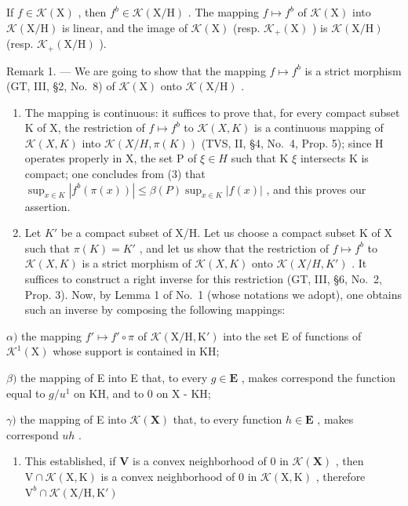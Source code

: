 If \(f \in \mathcal{K}(\mathrm{X})\) , then \(f^{b} \in \mathcal{K}(\mathrm{X / H})\) . The mapping \(f \mapsto f^{b}\) of \(\mathcal{K}(\mathrm{X})\) into \(\mathcal{K}(\mathrm{X / H})\) is linear, and the image of \(\mathcal{K}(\mathrm{X})\) (resp. \(\mathcal{K}_{+}(\mathrm{X})\) ) is \(\mathcal{K}(\mathrm{X / H})\) (resp. \(\mathcal{K}_{+}(\mathrm{X / H})\) ).

Remark 1. --- We are going to show that the mapping \(f \mapsto f^{b}\) is a strict morphism (GT, III, §2, No.~8) of \(\mathcal{K}(\mathrm{X})\) onto \(\mathcal{K}(\mathrm{X}/\mathrm{H})\) .

\begin{enumerate}
\def\labelenumi{\alph{enumi})}
\item
  The mapping is continuous: it suffices to prove that, for every compact subset K of X, the restriction of \(f \mapsto f^{b}\) to \(\mathcal{K}(X, K)\) is a continuous mapping of \(\mathcal{K}(X, K)\) into \(\mathcal{K}(X / H, \pi(K))\) (TVS, II, §4, No.~4, Prop. 5); since H operates properly in X, the set P of \(\xi \in H\) such that K \(\xi\) intersects K is compact; one concludes from (3) that \(\sup_{x \in K} |f^{b}(\pi(x))| \leqslant \beta(P) \sup_{x \in K} |f(x)|\) , and this proves our assertion.
\item
  Let \(K'\) be a compact subset of X/H. Let us choose a compact subset K of X such that \(\pi(K) = K'\) , and let us show that the restriction of \(f \mapsto f^{b}\) to \(\mathcal{K}(X, K)\) is a strict morphism of \(\mathcal{K}(X, K)\) onto \(\mathcal{K}(X/H, K')\) . It suffices to construct a right inverse for this restriction (GT, III, §6, No.~2, Prop. 3). Now, by Lemma 1 of No.~1 (whose notations we adopt), one obtains such an inverse by composing the following mappings:
\end{enumerate}

\(\alpha)\) the mapping \(f' \mapsto f' \circ \pi\) of \(\mathcal{K}(\mathrm{X}/\mathrm{H}, \mathrm{K}')\) into the set E of functions of \(\mathcal{K}^1(\mathrm{X})\) whose support is contained in KH;

\(\beta)\) the mapping of E into E that, to every \(g \in \mathbf{E}\) , makes correspond the function equal to \(g / u^1\) on KH, and to 0 on X - KH;

\(\gamma)\) the mapping of E into \(\mathcal{K}(\mathbf{X})\) that, to every function \(h \in \mathbf{E}\) , makes correspond \(uh\) .

\begin{enumerate}
\def\labelenumi{\alph{enumi})}
\setcounter{enumi}{2}
\tightlist
\item
  This established, if \(\mathbf{V}\) is a convex neighborhood of 0 in \(\mathcal{K}(\mathbf{X})\) , then \(\mathrm{V} \cap \mathcal{K}(\mathrm{X}, \mathrm{K})\) is a convex neighborhood of 0 in \(\mathcal{K}(\mathrm{X}, \mathrm{K})\) , therefore \(\mathrm{V}^{b} \cap \mathcal{K}(\mathrm{X} / \mathrm{H}, \mathrm{K}')\)
\end{enumerate}

